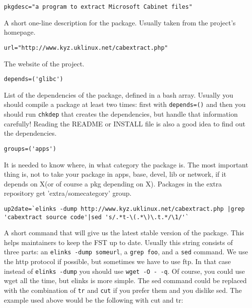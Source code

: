 \begin{verbatim}
pkgdesc="a program to extract Microsoft Cabinet files"
\end{verbatim}

A short one-line description for the package. Usually taken from the project's homepage.

\begin{verbatim}
url="http://www.kyz.uklinux.net/cabextract.php"
\end{verbatim}

The website of the project.

\begin{verbatim}
depends=('glibc')
\end{verbatim}

List of the dependencies of the package, defined in a bash array. Usually you should compile a package at least two times: first with {\tt depends=()} and then you should run {\tt chkdep} that creates the dependencies, but handle that information carefully! Reading the README or INSTALL file is also a good idea to find out the dependencies.

\begin{verbatim}
groups=('apps')
\end{verbatim}

It is needed to know where, in what category the package is. The most important thing is, not to take your package in apps, base, devel, lib or network, if it depends on X(or of course a pkg depending on X).
Packages in the extra repository get 'extra/somecategory' group.

\begin{verbatim}
up2date=`elinks -dump http://www.kyz.uklinux.net/cabextract.php |grep 'cabextract source code'|sed 's/.*t-\(.*\)\.t.*/\1/'`
\end{verbatim}

A short command that will give us the latest stable version of the package. This helps maintainers to keep the FST up to date. Usually this string consists of three parts: an {\tt elinks -dump someurl}, a {\tt grep foo}, and a {\tt sed} command. We use the http protocol if possible, but sometimes we have to use ftp. In that case instead of {\tt elinks -dump} you should use {\tt wget -O - -q}. Of course, you could use wget all the time, but elinks is more simple. The sed command could be replaced with the combination of {\tt tr} and {\tt cut} if you prefer them and you dislike sed. The example used above would be the following with cut and tr:

